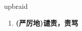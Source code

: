 
\begin{frame}
{\huge upbraid}
\begin{center}
\begin{enumerate}\Large
  \item \textbf{(严厉地)谴责，责骂}
\end{enumerate}
\end{center}
\end{frame}
